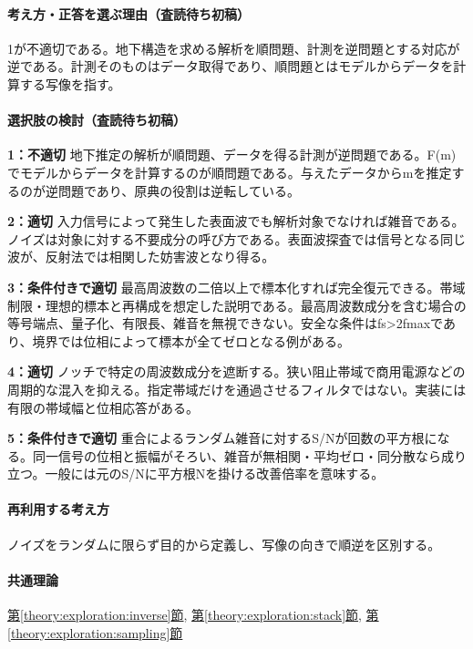 \paragraph{考え方・正答を選ぶ理由（査読待ち初稿）} 1が不適切である。地下構造を求める解析を順問題、計測を逆問題とする対応が逆である。計測そのものはデータ取得であり、順問題とはモデルからデータを計算する写像を指す。

\paragraph{選択肢の検討（査読待ち初稿）}\mbox{}\par

\noindent\textbf{1：不適切} 地下推定の解析が順問題、データを得る計測が逆問題である。F(m)でモデルからデータを計算するのが順問題である。与えたデータからmを推定するのが逆問題であり、原典の役割は逆転している。\par

\noindent\textbf{2：適切} 入力信号によって発生した表面波でも解析対象でなければ雑音である。ノイズは対象に対する不要成分の呼び方である。表面波探査では信号となる同じ波が、反射法では相関した妨害波となり得る。\par

\noindent\textbf{3：条件付きで適切} 最高周波数の二倍以上で標本化すれば完全復元できる。帯域制限・理想的標本と再構成を想定した説明である。最高周波数成分を含む場合の等号端点、量子化、有限長、雑音を無視できない。安全な条件はfs>2fmaxであり、境界では位相によって標本が全てゼロとなる例がある。\par

\noindent\textbf{4：適切} ノッチで特定の周波数成分を遮断する。狭い阻止帯域で商用電源などの周期的な混入を抑える。指定帯域だけを通過させるフィルタではない。実装には有限の帯域幅と位相応答がある。\par

\noindent\textbf{5：条件付きで適切} 重合によるランダム雑音に対するS/Nが回数の平方根になる。同一信号の位相と振幅がそろい、雑音が無相関・平均ゼロ・同分散なら成り立つ。一般には元のS/Nに平方根Nを掛ける改善倍率を意味する。\par

\paragraph{再利用する考え方} ノイズをランダムに限らず目的から定義し、写像の向きで順逆を区別する。

\paragraph{共通理論} \hyperref[theory:exploration:inverse]{第\ref*{theory:exploration:inverse}節}, \hyperref[theory:exploration:stack]{第\ref*{theory:exploration:stack}節}, \hyperref[theory:exploration:sampling]{第\ref*{theory:exploration:sampling}節}


